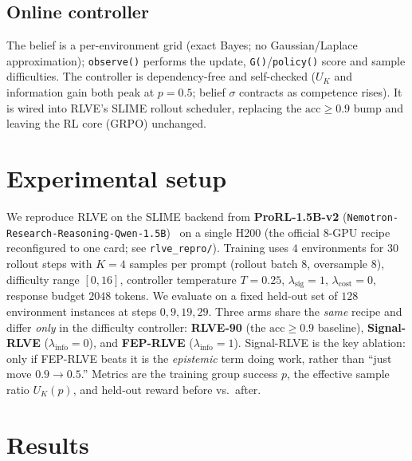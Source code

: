 \documentclass{article}
\newcommand{\UK}{U_{K}}
\begin{document}
\subsection{Online controller}
The belief is a per-environment grid (exact Bayes; no Gaussian/Laplace
approximation); \texttt{observe()} performs the update, \texttt{G()}/\texttt{policy()}
score and sample difficulties. The controller is dependency-free and self-checked
($\UK$ and information gain both peak at $p{=}0.5$; belief $\sigma$ contracts as
competence rises). It is wired into RLVE's SLIME rollout scheduler, replacing the
$\mathrm{acc}\ge0.9$ bump and leaving the RL core (GRPO) unchanged.

\section{Experimental setup}
\label{sec:setup}
We reproduce RLVE on the SLIME backend from \textbf{ProRL-1.5B-v2}
(\texttt{Nemotron-Research-Reasoning-Qwen-1.5B})~\citep{liu2025prorl} on a single
H200 (the official 8-GPU recipe reconfigured to one card; see
\texttt{rlve\_repro/}). Training uses $4$ environments for $30$ rollout steps with
$K{=}4$ samples per prompt (rollout batch $8$, oversample $8$), difficulty range
$[0,16]$, controller temperature $T{=}0.25$, $\lambda_{\mathrm{sig}}{=}1$,
$\lambda_{\mathrm{cost}}{=}0$, response budget $2048$ tokens. We evaluate on a
fixed held-out set of $128$ environment instances at steps $0,9,19,29$. Three arms
share the \emph{same} recipe and differ \emph{only} in the difficulty controller:
\textbf{RLVE-90} (the $\mathrm{acc}\ge0.9$ baseline), \textbf{Signal-RLVE}
($\lambda_{\mathrm{info}}{=}0$), and \textbf{FEP-RLVE} ($\lambda_{\mathrm{info}}{=}1$).
Signal-RLVE is the key ablation: only if FEP-RLVE beats it is the \emph{epistemic}
term doing work, rather than ``just move $0.9\to0.5$.'' Metrics are the training
group success $p$, the effective sample ratio $\UK(p)$, and held-out reward
before vs.\ after.

\section{Results}
\label{sec:results}
\end{document}
